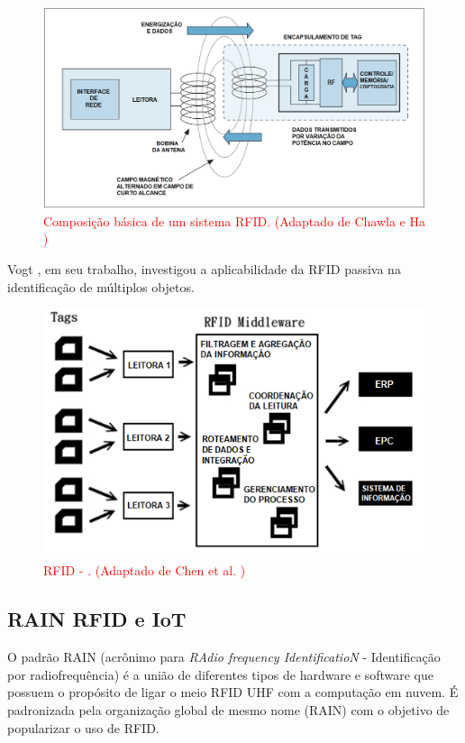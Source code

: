 \begin{figure}[H]
    \centering
    \includegraphics[width=0.8\linewidth]{figs/Fundamentos/RFIDdetails.png}
    \caption{\textcolor{red}{Composição básica de um sistema RFID. (Adaptado de Chawla e Ha \cite{chawla2007overview})}}
    \label{fig:DetalhesRFID}
\end{figure}



Vogt \cite{vogt2002multiple}, em seu trabalho, investigou a aplicabilidade da RFID passiva na identificação de múltiplos objetos.

\begin{figure}[H]
    \centering
    \includegraphics[width=0.6\linewidth]{figs/Fundamentos/RFID.png}
    \caption{\textcolor{red}{RFID - . (Adaptado de Chen et al. \cite{chenUsingRFID})}}
    \label{fig:RFID-Middleware}
\end{figure}


\subsection{RAIN RFID e IoT}

O padrão RAIN (acrônimo para \textit{RAdio frequency IdentificatioN} - Identificação por radiofrequência) é a união de diferentes tipos de hardware e software que possuem o propósito de ligar o meio RFID UHF com a computação em nuvem. É padronizada pela organização global de mesmo nome (RAIN) com o objetivo de popularizar o uso de RFID. \cite{RAIN}

